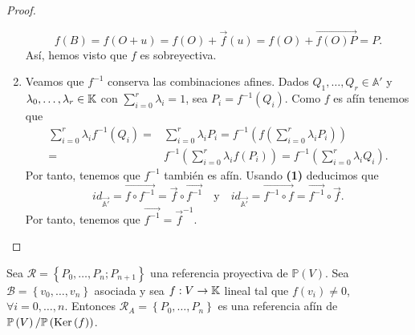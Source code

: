 \begin{proof}
\begin{enumerate}
\[f\left(B\right) = f\left(O + u\right) = f\left(O \right)+ \vec{f}\left(u\right) = f\left(O\right) + \overrightarrow{f\left(O\right)P} = P .\]
Así, hemos visto que $\displaystyle f $ es sobreyectiva. 
\item Veamos que $\displaystyle f^{-1} $ conserva las combinaciones afines. Dados $\displaystyle Q_{1}, \ldots, Q_{r} \in \mathbb{A}' $ y $\displaystyle \lambda_{0}, \ldots, \lambda_{r} \in \mathbb{K} $ con $\displaystyle \sum^{r}_{i = 0}\lambda_{i} = 1 $, sea $\displaystyle P_{i} = f^{-1}\left(Q_{i}\right) $. Como $\displaystyle f $ es afín tenemos que
	\[
	\begin{split}
		\sum^{r}_{i = 0}\lambda_{i}f^{-1}\left(Q_{i}\right) = & \sum^{r}_{i = 0}\lambda_{i}P_{i} = f^{-1}\left(f\left(\sum^{r}_{i = 0}\lambda_{i}P_{i}\right)\right) \\
		= & f^{-1}\left(\sum^{r}_{i = 0}\lambda_{i}f\left(P_{i}\right)\right) = f^{-1}\left(\sum^{r}_{i = 0}\lambda_{i}Q_{i}\right) .
	\end{split}
	\]
	Por tanto, tenemos que $\displaystyle f^{-1} $ también es afín. Usando \textbf{(1)} deducimos que
	\[id _{\vec{\mathbb{A}'}} = \overrightarrow{f \circ f^{-1}} = \vec{f}\circ \overrightarrow{f^{-1}} \quad \text{y}\quad id _{\vec{\mathbb{A}'}} = \overrightarrow{f^{-1}\circ f} = \overrightarrow{f^{-1}}\circ \vec{f} .\]
Por tanto, tenemos que $\displaystyle \overrightarrow{f^{-1}} = \vec{f}^{-1} $. 	
	\end{enumerate}
\end{proof}
\begin{prop}
	Sea $\displaystyle \mathcal{R} = \left\{ P_{0}, \ldots, P_{n}; P_{n+1}\right\}  $ una referencia proyectiva de $\displaystyle \mathbb{P}\left(V\right) $. Sea $\displaystyle \mathcal{B} = \left\{ v_{0}, \ldots, v_{n}\right\}  $ asociada y sea $\displaystyle f : V \to \mathbb{K} $ lineal tal que $\displaystyle f\left(v_{i}\right) \neq 0 $, $\displaystyle \forall i = 0, \ldots, n $. Entonces $\displaystyle \mathcal{R}_{A} = \left\{ P_{0}, \ldots, P_{n}\right\}  $ es una referencia afín de $\displaystyle \mathbb{P}\left(V\right) / \mathbb{P}\left(\operatorname{Ker}\left(f\right)\right) $. 
\end{prop}
